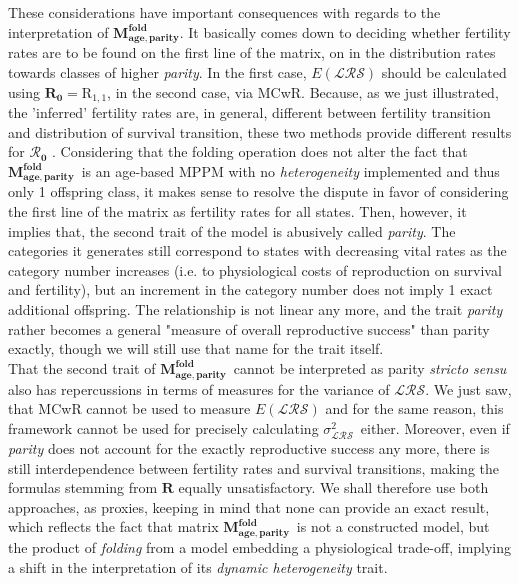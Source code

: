 \documentclass[10pt,a4paper]{article}
\newcommand{\Rzero}{$\boldsymbol{\mathcal{R}_{0}}$  }
\newcommand{\LRO}{$\mathcal{LRS}$}
\newcommand{\Map}{$\mathbf{M^{fold}_{age,parity}}$}
\newcommand{\vLRO}{$\sigma_{\mathrm{\mathcal{LRS}}}^2$}
\begin{document}
These considerations have important consequences with regards to the interpretation of  \Map. It basically comes down to deciding whether fertility rates are to be found on the first line of the matrix, on in the distribution rates towards classes of higher \emph{parity}. In the first case, ${E}(\mathcal{LRS})$ should be calculated using $\mathbf{R_0}=\mathrm{R}_{1,1}$, in the second case, via MCwR. Because, as we just illustrated, the 'inferred' fertility rates are, in general, different between fertility transition and distribution of survival transition, these two methods provide different results for \Rzero. 
Considering that the folding operation does not alter the fact that \Map\ is an age-based MPPM with no \emph{heterogeneity} implemented and thus only 1 offspring class, it makes sense to resolve the dispute in favor of considering the first line of the matrix as fertility rates for all states.  Then, however, it implies that, the second trait of the model is abusively called \textit{parity}. The categories it generates still correspond to states with decreasing vital rates as the category number increases (i.e. to physiological costs of reproduction on survival and fertility), but an increment in the category number does not imply 1 exact additional offspring.%
The relationship is not linear any more, and the trait \emph{parity} rather becomes a general "measure of overall reproductive success" than parity exactly, though we will still use that name for the trait itself. \\

That the second trait of \Map\ cannot be interpreted as parity \emph{stricto sensu} also has repercussions in terms of measures for the variance of \LRO. We just saw, that MCwR cannot be used to measure ${E}({\mathcal{LRS}})$ and for the same reason, this framework cannot be used for precisely calculating \vLRO\ either. Moreover, even if \emph{parity} does not account for the exactly reproductive success any more, there is still interdependence between fertility rates and survival transitions, making the formulas stemming from $\mathbf{R}$ equally unsatisfactory.
We shall therefore use both approaches, as proxies, keeping in mind that none can provide an exact result, which reflects the fact that matrix \Map\ is not a constructed model, but the product of \emph{folding} from a model embedding a physiological trade-off, implying a shift in the interpretation of its \emph{dynamic heterogeneity} trait. 
\end{document}
